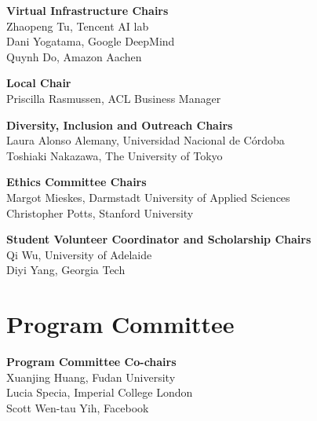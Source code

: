 {\bf Virtual Infrastructure Chairs} \\
Zhaopeng Tu, Tencent AI lab\\
Dani Yogatama, Google DeepMind \\
Quynh Do, Amazon Aachen

{\bf Local Chair} \\
Priscilla Rasmussen, ACL Business Manager

{\bf Diversity, Inclusion and Outreach Chairs} \\
Laura Alonso Alemany, Universidad Nacional de Córdoba \\
Toshiaki Nakazawa, The University of Tokyo

{\bf Ethics Committee Chairs} \\
Margot Mieskes, Darmstadt University of Applied Sciences \\
Christopher Potts, Stanford University

{\bf Student Volunteer Coordinator and Scholarship Chairs} \\
Qi Wu, University of Adelaide \\
Diyi Yang, Georgia Tech



\clearpage
\section{Program Committee}
\setlength{\parindent}{0pt}

\vspace*{0.5cm}

{\bf Program Committee Co-chairs} \\
Xuanjing Huang, Fudan University\\
Lucia Specia, Imperial College London\\
Scott Wen-tau Yih, Facebook

